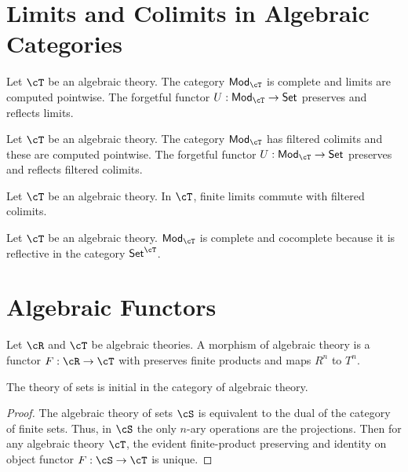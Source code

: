 \documentclass{amsart}
\begin{document}
\section{Limits and Colimits in Algebraic Categories}
\label{sec:limits-and-colimits-in-algebraic-categories}

\begin{lem}
  Let $\cT$ be an algebraic theory.
  The category $\mathsf{Mod}_{\cT}$ is complete and limits are computed pointwise.
  The forgetful functor $U : \mathsf{Mod}_{\cT} \to \mathsf{Set}$ preserves and reflects limits.
\end{lem}

\begin{lem}
  Let $\cT$ be an algebraic theory.
  The category $\mathsf{Mod}_{\cT}$ has filtered colimits and these are computed pointwise.
  The forgetful functor $U : \mathsf{Mod}_{\cT} \to \mathsf{Set}$ preserves and reflects filtered colimits.
\end{lem}

\begin{lem}
  Let $\cT$ be an algebraic theory.
  In $\mathsf{\cT}$, finite limits commute with filtered colimits.
\end{lem}

\begin{lem}\label{lem:model-category-complete-cocomplete}
  Let $\cT$ be an algebraic theory.
  $\mathsf{Mod}_{\cT}$ is complete and cocomplete because it is reflective in the category $\mathsf{Set}^{\cT}$.
\end{lem}

\section{Algebraic Functors}
\label{sec:algebraic-functors}

\begin{defn}
  Let $\cR$ and $\cT$ be algebraic theories.
  A morphism of algebraic theory is a functor $F : \cR \to \cT$ with preserves finite products and maps $R^{n}$ to $T^{n}$.
\end{defn}

\begin{lem}
  The theory of sets is initial in the category of algebraic theory.
\end{lem}
\begin{proof}
  The algebraic theory of sets $\cS$ is equivalent to the dual of the category of finite sets.
  Thus, in $\cS$ the only $n$-ary operations are the projections.
  Then for any algebraic theory $\cT$, the evident finite-product preserving and identity on object functor $F : \cS \to \cT$ is unique.
\end{proof}
\end{document}
